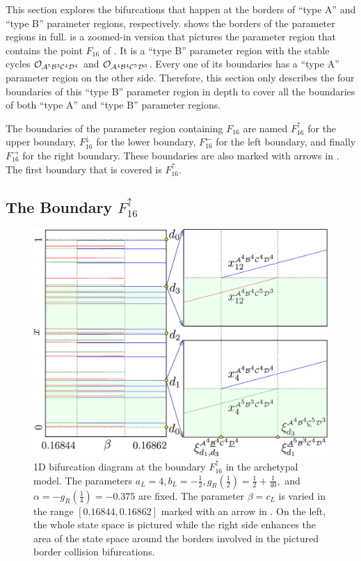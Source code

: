 This section explores the bifurcations that happen at the borders of ``type A'' and ``type B'' parameter regions, respectively.
 shows the borders of the parameter regions in full.
 is a zoomed-in version that pictures the parameter region that contains the point $F_{16}$ of .
It is a ``type B'' parameter region with the stable cycles $\mathcal{O}_{\mathcal{A}^5\mathcal{B}^3\mathcal{C}^4\mathcal{D}^4}$ and $\mathcal{O}_{\mathcal{A}^4\mathcal{B}^4\mathcal{C}^5\mathcal{D}^3}$.
Every one of its boundaries has a ``type A'' parameter region on the other side.
Therefore, this section only describes the four boundaries of this ``type B'' parameter region in depth to cover all the boundaries of both ``type A'' and ``type B'' parameter regions.

The boundaries of the parameter region containing $F_{16}$ are named $F_{16}^\uparrow$ for the upper boundary, $F_{16}^\downarrow$ for the lower boundary, $F_{16}^\leftarrow$ for the left boundary, and finally $F_{16}^\rightarrow$ for the right boundary.
These boundaries are also marked with arrows in .
The first boundary that is covered is $F_{16}^\uparrow$.

\subsection{The Boundary $F_{16}^\uparrow$}
\label{sec:arch.bif.U}

\begin{figure}
	\centering
	\includegraphics[width=.7 \textwidth]{../Figures/6/6.4/result.png}
	\caption[1D bifurcation diagram at the boundary $F_{16}^\uparrow$ in the archetypal model]{
		1D bifurcation diagram at the boundary $F_{16}^\uparrow$ in the archetypal model.
		The parameters $a_L = 4, b_L = -\frac{1}{2}, g_R\left(\frac{1}{2}\right) = \frac{1}{2} + \frac{1}{40},$ and $\alpha = -g_R\left(\frac{1}{4}\right) = -0.375$ are fixed.
		The parameter $\beta = c_L$ is varied in the range $[0.16844, 0.16862]$ marked with an arrow in .
		On the left, the whole state space is pictured while the right side enhances the area of the state space around the borders involved in the pictured border collision bifurcations.
	}
	\label{fig:arch.bif.F.up}
\end{figure}

